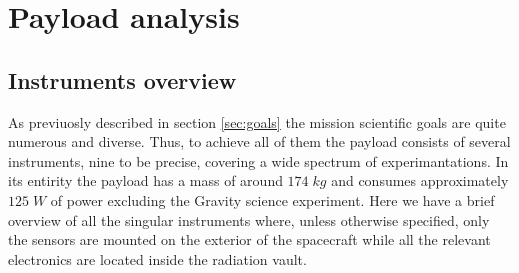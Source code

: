 \section{Payload analysis}
\label{sec:payload}

\subsection{Instruments overview}
As previuosly described in section \ref{sec:goals} the mission scientific goals are quite numerous and diverse. Thus, to achieve all of them the payload consists of several instruments, nine to be precise, covering a wide spectrum of experimantations. In its entirity the payload has a mass of around $174 \;kg$ and consumes approximately $125 \;W$ of power excluding the Gravity science experiment. %
Here we have a brief overview of all the singular instruments where, unless otherwise specified, only the sensors are mounted on the exterior of the spacecraft while all the relevant electronics are located inside the radiation vault. 

